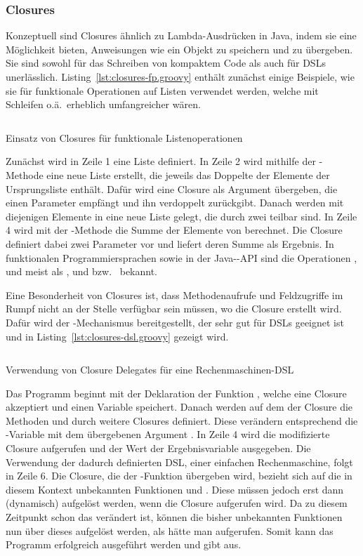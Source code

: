 \documentclass[a4paper]{article}
\newcommand{\codelisting}[3]{\begin{listing}[htp]
	\inputminted{#1}{#1/#2}
	\vspace{-3ex}
	\caption{#3}
	\label{lst:#2}
\end{listing}}
\begin{document}
\subsubsection{Closures}\label{subsubsec:closures}

Konzeptuell sind Closures ähnlich zu Lambda-Ausdrücken in Java, indem sie eine Möglichkeit bieten, Anweisungen wie ein Objekt zu speichern und zu übergeben.
Sie sind sowohl für das Schreiben von kompaktem Code als auch für DSLs unerlässlich.
Listing~\ref{lst:closures-fp.groovy} enthält zunächst einige Beispiele, wie sie für funktionale Operationen auf Listen verwendet werden, welche mit Schleifen o.ä.~erheblich umfangreicher wären.

\codelisting{groovy}{closures-fp.groovy}{Einsatz von Closures für funktionale Listenoperationen}

Zunächst wird in Zeile 1 eine Liste definiert.
In Zeile 2 wird mithilfe der -Methode eine neue Liste erstellt, die jeweils das Doppelte der Elemente der Ursprungsliste enthält.
Dafür wird eine Closure als Argument übergeben, die einen Parameter  empfängt und ihn verdoppelt zurückgibt.
Danach werden mit  diejenigen Elemente in eine neue Liste gelegt, die durch zwei teilbar sind.
In Zeile 4 wird mit der -Methode die Summe der Elemente von  berechnet.
Die Closure definiert dabei zwei Parameter vor \code{->} und liefert deren Summe als Ergebnis.
In funktionalen Programmiersprachen sowie in der Java--API sind die Operationen ,  und  meist als ,  und  bzw.~ bekannt.

Eine Besonderheit von Closures ist, dass Methodenaufrufe und Feldzugriffe im Rumpf nicht an der Stelle verfügbar sein müssen, wo die Closure erstellt wird.
Dafür wird der -Mechanismus bereitgestellt, der sehr gut für DSLs geeignet ist und in Listing~\ref{lst:closures-dsl.groovy} gezeigt wird.

\codelisting{groovy}{closures-dsl.groovy}{Verwendung von Closure Delegates für eine Rechenmaschinen-DSL}

Das Programm beginnt mit der Deklaration der Funktion , welche eine Closure akzeptiert und einen Variable  speichert.
Danach werden auf dem  der Closure die Methoden  und  durch weitere Closures definiert.
Diese verändern entsprechend die -Variable mit dem übergebenen Argument .
In Zeile 4 wird die modifizierte Closure aufgerufen und der Wert der Ergebnisvariable ausgegeben.
Die Verwendung der dadurch definierten DSL, einer einfachen Rechenmaschine, folgt in Zeile 6.
Die Closure, die der -Funktion übergeben wird, bezieht sich auf die in diesem Kontext unbekannten Funktionen  und .
Diese müssen jedoch erst dann (dynamisch) aufgelöst werden, wenn die Closure aufgerufen wird.
Da zu diesem Zeitpunkt schon das  verändert ist, können die bisher unbekannten Funktionen nun über dieses aufgelöst werden, als hätte man  aufgerufen.
Somit kann das Programm erfolgreich ausgeführt werden und gibt  aus.
\end{document}
